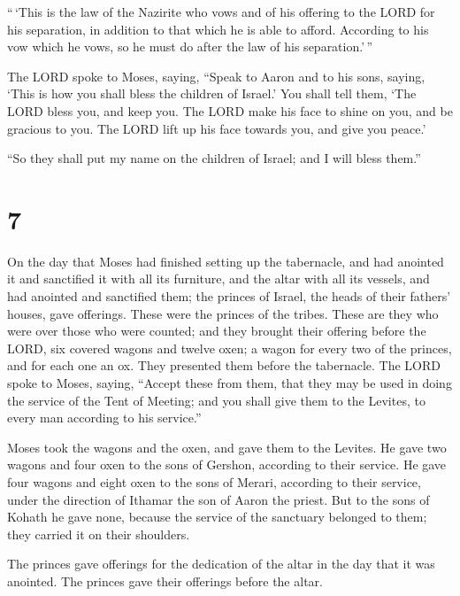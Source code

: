  ``\,`This is the law of the Nazirite who vows and of his
offering to the LORD for his separation, in addition to that which he is
able to afford. According to his vow which he vows, so he must do after
the law of his separation.'\,''

 The LORD spoke to Moses, saying,  ``Speak to
Aaron and to his sons, saying, `This is how you shall bless the children
of Israel.' You shall tell them,  `The LORD bless you, and
keep you.  The LORD make his face to shine on you, and be
gracious to you.  The LORD lift up his face towards you,
and give you peace.'

 ``So they shall put my name on the children of Israel; and
I will bless them.''

\hypertarget{section-6}{%
\section{7}\label{section-6}}

 On the day that Moses had finished setting up the
tabernacle, and had anointed it and sanctified it with all its
furniture, and the altar with all its vessels, and had anointed and
sanctified them;  the princes of Israel, the heads of their
fathers' houses, gave offerings. These were the princes of the tribes.
These are they who were over those who were counted;  and
they brought their offering before the LORD, six covered wagons and
twelve oxen; a wagon for every two of the princes, and for each one an
ox. They presented them before the tabernacle.  The LORD
spoke to Moses, saying,  ``Accept these from them, that they
may be used in doing the service of the Tent of Meeting; and you shall
give them to the Levites, to every man according to his service.''

 Moses took the wagons and the oxen, and gave them to the
Levites.  He gave two wagons and four oxen to the sons of
Gershon, according to their service.  He gave four wagons
and eight oxen to the sons of Merari, according to their service, under
the direction of Ithamar the son of Aaron the priest.  But
to the sons of Kohath he gave none, because the service of the sanctuary
belonged to them; they carried it on their shoulders.

 The princes gave offerings for the dedication of the altar
in the day that it was anointed. The princes gave their offerings before
the altar.

